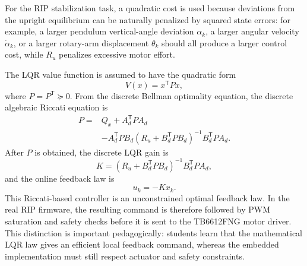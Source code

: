 \documentclass[11pt]{article}
\begin{document}
For the RIP stabilization task, a quadratic cost is used because deviations from the upright equilibrium can be naturally penalized by squared state errors: for example, a larger pendulum vertical-angle deviation $\alpha_k$, a larger angular velocity $\dot{\alpha}_k$, or a larger rotary-arm displacement $\theta_k$ should all produce a larger control cost, while $R_u$ penalizes excessive motor effort.

The LQR value function is assumed to have the quadratic form
\begin{equation}
V(x)=x^{\mathsf T}Px,
\label{eq:lqr_value}
\end{equation}
where $P=P^{\mathsf T}\succeq0$. From the discrete Bellman optimality equation, the discrete algebraic Riccati equation is
\begin{equation}
\begin{split}
P={}&Q_x+A_d^{\mathsf T}PA_d\\
&-A_d^{\mathsf T}PB_d
\left(R_u+B_d^{\mathsf T}PB_d\right)^{-1}
B_d^{\mathsf T}PA_d.
\end{split}
\label{eq:dare}
\end{equation}
After $P$ is obtained, the discrete LQR gain is
\begin{equation}
K=
\left(R_u+B_d^{\mathsf T}PB_d\right)^{-1}
B_d^{\mathsf T}PA_d,
\label{eq:lqr_gain}
\end{equation}
and the online feedback law is
\begin{equation}
u_k=-Kx_k.
\label{eq:lqr_feedback}
\end{equation}
This Riccati-based controller is an unconstrained optimal feedback law. In the real RIP firmware, the resulting command is therefore followed by PWM saturation and safety checks before it is sent to the TB6612FNG motor driver. This distinction is important pedagogically: students learn that the mathematical LQR law gives an efficient local feedback command, whereas the embedded implementation must still respect actuator and safety constraints.
\end{document}
